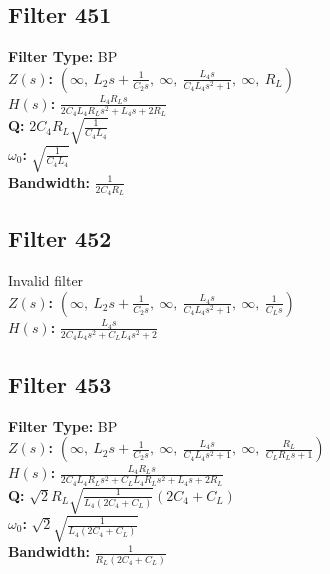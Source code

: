 \documentclass{article}
\begin{document}
\subsection*{Filter 451}
\textbf{Filter Type:} BP \\ 
\textbf{$Z(s)$:} $\left( \infty, \  L_{2} s + \frac{1}{C_{2} s}, \  \infty, \  \frac{L_{4} s}{C_{4} L_{4} s^{2} + 1}, \  \infty, \  R_{L}\right)$ \\ 
\textbf{$H(s)$:} $\frac{L_{4} R_{L} s}{2 C_{4} L_{4} R_{L} s^{2} + L_{4} s + 2 R_{L}}$ \\ 
\textbf{Q:} $2 C_{4} R_{L} \sqrt{\frac{1}{C_{4} L_{4}}}$ \\ 
\textbf{$\omega_0$:} $\sqrt{\frac{1}{C_{4} L_{4}}}$ \\ 
\textbf{Bandwidth:} $\frac{1}{2 C_{4} R_{L}}$ \\ 
\subsection*{Filter 452}
Invalid filter \\ 
\textbf{$Z(s)$:} $\left( \infty, \  L_{2} s + \frac{1}{C_{2} s}, \  \infty, \  \frac{L_{4} s}{C_{4} L_{4} s^{2} + 1}, \  \infty, \  \frac{1}{C_{L} s}\right)$ \\ 
\textbf{$H(s)$:} $\frac{L_{4} s}{2 C_{4} L_{4} s^{2} + C_{L} L_{4} s^{2} + 2}$ \\ 
\subsection*{Filter 453}
\textbf{Filter Type:} BP \\ 
\textbf{$Z(s)$:} $\left( \infty, \  L_{2} s + \frac{1}{C_{2} s}, \  \infty, \  \frac{L_{4} s}{C_{4} L_{4} s^{2} + 1}, \  \infty, \  \frac{R_{L}}{C_{L} R_{L} s + 1}\right)$ \\ 
\textbf{$H(s)$:} $\frac{L_{4} R_{L} s}{2 C_{4} L_{4} R_{L} s^{2} + C_{L} L_{4} R_{L} s^{2} + L_{4} s + 2 R_{L}}$ \\ 
\textbf{Q:} $\sqrt{2} R_{L} \sqrt{\frac{1}{L_{4} \left(2 C_{4} + C_{L}\right)}} \left(2 C_{4} + C_{L}\right)$ \\ 
\textbf{$\omega_0$:} $\sqrt{2} \sqrt{\frac{1}{L_{4} \left(2 C_{4} + C_{L}\right)}}$ \\ 
\textbf{Bandwidth:} $\frac{1}{R_{L} \left(2 C_{4} + C_{L}\right)}$ \\ 
\end{document}
